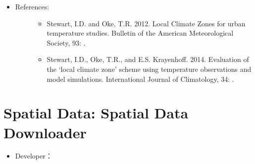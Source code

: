 \documentclass[letterpaper,10pt,english]{sphinxmanual}
\begin{document}
\begin{itemize}
\begin{description}
\begin{itemize}
\end{itemize}

\end{description}

\item {} \begin{description}
\item[{References:}] \leavevmode\begin{itemize}
\item {} 
Stewart, I.D. and Oke, T.R. 2012. Local Climate Zones for urban temperature studies. Bulletin of the American Meteorological Society, 93: .

\item {} 
Stewart, I.D., Oke, T.R., and E.S. Krayenhoff. 2014. Evaluation of the ‘local climate zone’ scheme using temperature observations and model simulations. International Journal of Climatology, 34: .

\end{itemize}

\end{description}

\end{itemize}


\section{Spatial Data: Spatial Data Downloader}
\label{\detokenize{pre-processor/Spatial Data Spatial Data Downloader:spatial-data-spatial-data-downloader}}\label{\detokenize{pre-processor/Spatial Data Spatial Data Downloader:spatialdatadownloader}}\label{\detokenize{pre-processor/Spatial Data Spatial Data Downloader::doc}}\begin{itemize}
\item {} 
Developer：

\end{itemize}
\end{document}
